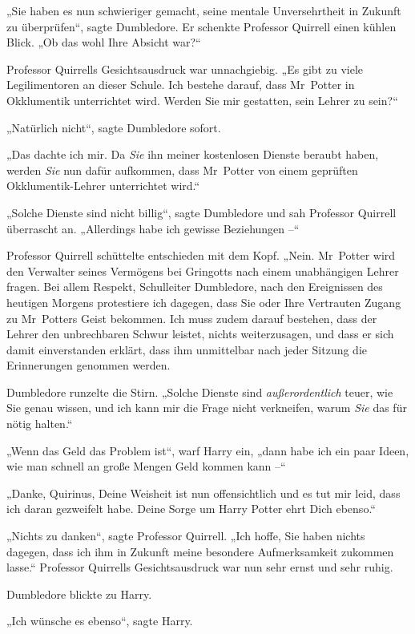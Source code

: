 {„Sie haben es nun schwieriger gemacht, seine mentale Unversehrtheit in Zukunft zu überprüfen“, sagte Dumbledore. Er schenkte Professor Quirrell einen kühlen Blick. „Ob das wohl Ihre Absicht war?“

Professor Quirrells Gesichtsausdruck war unnachgiebig. „Es gibt zu viele Legilimentoren an dieser Schule. Ich bestehe darauf, dass Mr~Potter in Okklumentik unterrichtet wird. Werden Sie mir gestatten, sein Lehrer zu sein?“

„Natürlich nicht“, sagte Dumbledore sofort.

„Das dachte ich mir. Da \emph{Sie} ihn meiner kostenlosen Dienste beraubt haben, werden \emph{Sie} nun dafür aufkommen, dass Mr~Potter von einem geprüften Okklumentik-Lehrer unterrichtet wird.“

„Solche Dienste sind nicht billig“, sagte Dumbledore und sah Professor Quirrell überrascht an. „Allerdings habe ich gewisse Beziehungen --“

Professor Quirrell schüttelte entschieden mit dem Kopf. „Nein. Mr~Potter wird den Verwalter seines Vermögens bei Gringotts nach einem unabhängigen Lehrer fragen. Bei allem Respekt, Schulleiter Dumbledore, nach den Ereignissen des heutigen Morgens protestiere ich dagegen, dass Sie oder Ihre Vertrauten Zugang zu Mr~Potters Geist bekommen. Ich muss zudem darauf bestehen, dass der Lehrer den unbrechbaren Schwur leistet, nichts weiterzusagen, und dass er sich damit einverstanden erklärt, dass ihm unmittelbar nach jeder Sitzung die Erinnerungen genommen werden.

Dumbledore runzelte die Stirn. „Solche Dienste sind \emph{außerordentlich} teuer, wie Sie genau wissen, und ich kann mir die Frage nicht verkneifen, warum \emph{Sie} das für nötig halten.“

„Wenn das Geld das Problem ist“, warf Harry ein, „dann habe ich ein paar Ideen, wie man schnell an große Mengen Geld kommen kann --“

„Danke, Quirinus, Deine Weisheit ist nun offensichtlich und es tut mir leid, dass ich daran gezweifelt habe. Deine Sorge um Harry Potter ehrt Dich ebenso.“

„Nichts zu danken“, sagte Professor Quirrell. „Ich hoffe, Sie haben nichts dagegen, dass ich ihm in Zukunft meine besondere Aufmerksamkeit zukommen lasse.“ Professor Quirrells Gesichtsausdruck war nun sehr ernst und sehr ruhig.

Dumbledore blickte zu Harry.

„Ich wünsche es ebenso“, sagte Harry.

}
